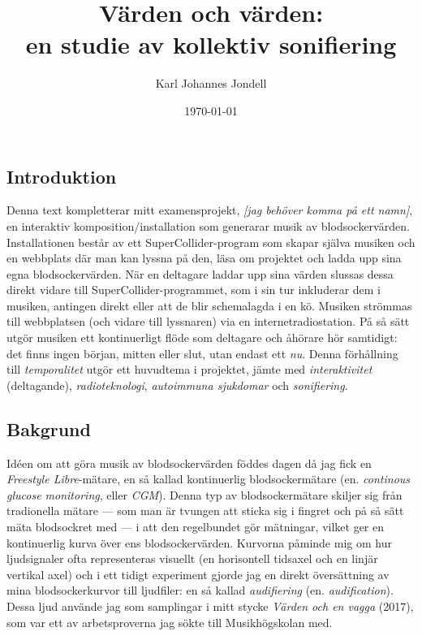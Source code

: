 \documentclass[11pt, twoside, a4paper]{article}
\title{Värden och värden:\\
	\large en studie av kollektiv sonifiering
}
\author{Karl Johannes Jondell}
\date{\today}
\begin{document}



\tableofcontents
\clearpage

\newpage
\begin{multicols}{2}

\section*{Introduktion}
Denna text kompletterar mitt examensprojekt, \emph{[jag behöver komma på ett namn]}, en interaktiv komposition/installation som generarar musik av blodsockervärden. Installationen består av ett SuperCollider-program som skapar själva musiken och en webbplats där man kan lyssna på den, läsa om projektet och ladda upp sina egna blodsockervärden. När en deltagare laddar upp sina värden slussas dessa direkt vidare till SuperCollider-programmet, som i sin tur inkluderar dem i musiken, antingen direkt eller att de blir schemalagda i en kö. Musiken strömmas till webbplatsen (och vidare till lyssnaren) via en internetradiostation. På så sätt utgör musiken ett kontinuerligt flöde som deltagare och åhörare hör samtidigt: det finns ingen början, mitten eller slut, utan endast ett \emph{nu}. Denna förhållning till \emph{temporalitet} utgör ett huvudtema i projektet, jämte med \emph{interaktivitet} (deltagande), \emph{radioteknologi}, \emph{autoimmuna sjukdomar} och \emph{sonifiering}.



\subsection*{Bakgrund}
Idéen om att göra musik av blodsockervärden föddes dagen då jag fick en \emph{Freestyle Libre}-mätare, en så kallad kontinuerlig blodsockermätare (en. \emph{continous glucose monitoring}, eller \emph{CGM}). Denna typ av blodsockermätare skiljer sig från tradionella mätare --- som man är tvungen att sticka sig i fingret och på så sätt mäta blodsockret med --- i att den regelbundet gör mätningar, vilket ger en kontinuerlig kurva över ens blodsockervärden. Kurvorna påminde mig om hur ljudsignaler ofta representeras visuellt (en horisontell tidsaxel och en linjär vertikal axel) och i ett tidigt experiment gjorde jag en direkt översättning av mina blodsockerkurvor till ljudfiler: en så kallad \emph{audifiering} (en. \emph{audification}). Dessa ljud använde jag som samplingar i mitt stycke \emph{Värden och en vagga} (2017), som var ett av arbetsproverna jag sökte till Musikhögskolan med. 


\end{multicols}
\end{document}
